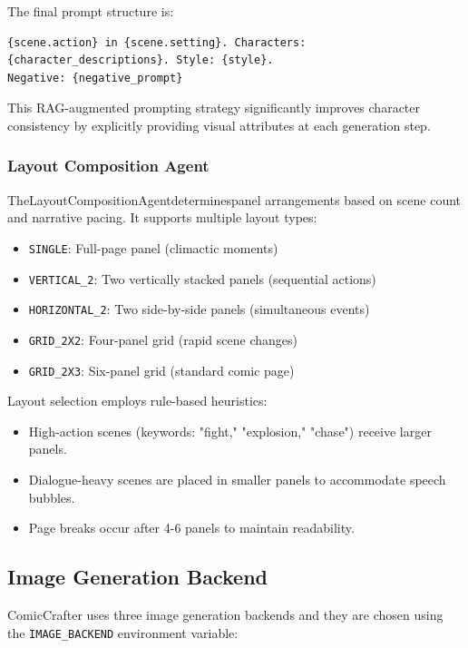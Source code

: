 \documentclass[runningheads]{llncs}
\begin{document}
The final prompt structure is:

\begin{small}
\begin{verbatim}
{scene.action} in {scene.setting}. Characters:
{character_descriptions}. Style: {style}.
Negative: {negative_prompt}
\end{verbatim}
\end{small}

This RAG-augmented prompting strategy significantly improves character consistency by explicitly providing visual attributes at each generation step.

\subsubsection{Layout Composition Agent}

TheLayoutCompositionAgentdeterminespanel arrangements based on scene count and narrative pacing. It supports multiple layout types:
\begin{itemize}
\item \texttt{SINGLE}: Full-page panel (climactic moments)
\item \texttt{VERTICAL\_2}: Two vertically stacked panels (sequential actions)
\item \texttt{HORIZONTAL\_2}: Two side-by-side panels (simultaneous events)
\item \texttt{GRID\_2X2}: Four-panel grid (rapid scene changes)
\item \texttt{GRID\_2X3}: Six-panel grid (standard comic page)
\end{itemize}

Layout selection employs rule-based heuristics:
\begin{itemize}
\item High-action scenes (keywords: "fight," "explosion," "chase") receive larger panels.
\item Dialogue-heavy scenes are placed in smaller panels to accommodate speech bubbles.
\item Page breaks occur after 4-6 panels to maintain readability.
\end{itemize}

\subsection{Image Generation Backend}

ComicCrafter uses three image generation backends and they are chosen using the \texttt{IMAGE\_BACKEND} environment variable:
\end{document}
